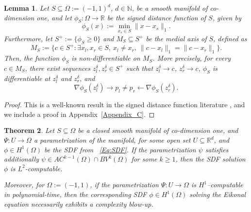\documentclass[pdflatex]{sn-jnl}%
\newtheorem{theorem}{Theorem}[section]%
\newtheorem{lemma}[theorem]{Lemma}
\begin{document}
\begin{lemma}\label{lemm:disc_sol}
    Let $S\subseteq \Omega:=(-1,1)^d$, $d\in \mathbb{N}$, be a smooth manifold of co-dimension one, and let $\phi_S:\Omega\rightarrow \mathbb{R}$ be the signed distance function of $S$, given by 
    \begin{equation}\label{Eq:SDF}
    \phi_S(x):=\min\limits_{x_s\in S}\|x-x_s\|_1.
    \end{equation}
    Furthermore, let $S^+:=\{\phi_S\geq 0\}$ and $M_S\subseteq S^+$ be the medial axis of $S$, defined as
    \begin{equation}
        M_S:=\{c\in S^+: \exists x_l,x_r\in S,\ x_l\neq x_r,\ \|c-x_l\|_1 = \|c-x_r\|_1\}.
    \end{equation}
    Then, the function $\phi_S$ is non-differentiable on $M_S$. More precisely, for every $c\in M_S$, there exist sequences $z_l^\delta,z_r^\delta\in S^+$ such that $z_l^\delta\to c$, $z_r^\delta\to c$, $\phi_S$ is differentiable at $z_l^\delta$ and $z_r^\delta$, and 
    \begin{equation}
        \nabla\phi_S(z_l^\delta)\to p_l \neq p_r \leftarrow \nabla\phi_S(z_r^\delta).
    \end{equation}
\end{lemma}
\vspace{-1em}\begin{proof}
 This is a well-known result in the signed distance function literature \cite{Alimov2019-np}, and we include a proof in Appendix~\ref{Appendix_C}. 
\end{proof}
\begin{theorem}\label{thm:compl_blowup}
    Let $S\subseteq \Omega$ be a closed smooth manifold of co-dimension one, and $\Psi:U\rightarrow \Omega$ a parametrization of the manifold, for some open set $U\subseteq \mathbb{R}^d$, and $\phi\in H^1(\Omega)$ be the SDF from ~\eqref{Eq:SDF}. If the parametrization $\psi$ satisfies additionally $\psi\in AC^{k-1}(\Omega)\cap BV^k(\Omega)$ for some $k\geq 1$, then  the SDF solution $\phi$ is $L^2$-computable. 
    
Moreover, for $\Omega:=(-1,1)$, if the parametrization 
$\Psi : U \rightarrow \Omega$ is $H^1$–computable in polynomial-time, then the 
corresponding SDF $\phi \in H^{1}(\Omega)$ solving the Eikonal equation necessarily exhibits a complexity blow-up.
\end{theorem}
\end{document}
